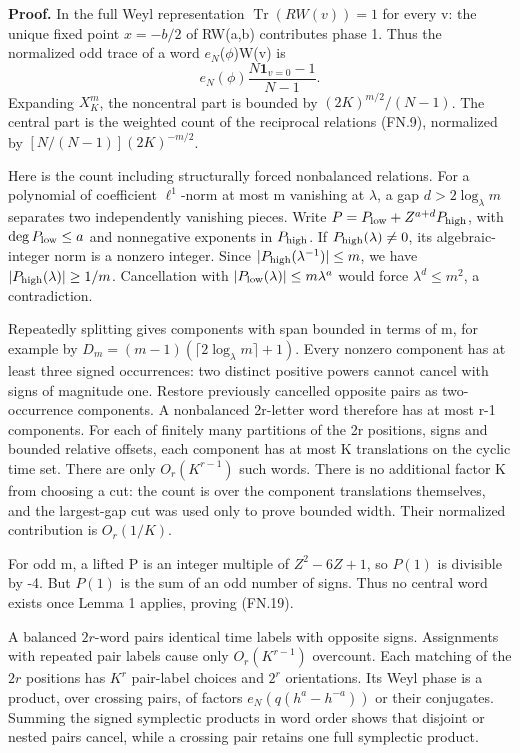 \textbf{Proof.} In the full Weyl representation \(\operatorname{Tr}(RW(v))=1\) for every v: the unique fixed point \(x=-b/2\) of RW(a,b) contributes phase 1. Thus the normalized odd trace of a word \(e_{N}\)(\(\phi\))W(v) is \[
 e_N(\phi)\frac{N\mathbf1_{v=0}-1}{N-1}.                       \tag{FN.20}
\] Expanding \(X_K^m\), the noncentral part is bounded by \((2K)^{m/2}/(N-1)\). The central part is the weighted count of the reciprocal relations (FN.9), normalized by \([N/(N-1)](2K)^{-m/2}\).

Here is the count including structurally forced nonbalanced relations. For a polynomial of coefficient \(\ell^1\)-norm at most m vanishing at \(\lambda\), a gap \(d>2\log_\lambda m\) separates two independently vanishing pieces. Write \(P=P_{\rm low}+Z^{a+d}P_{\rm high}\), with \(\deg P_{\rm low}\leq a\) and nonnegative exponents in \(P_{\rm high}\). If \(P_{\rm high}(\lambda)\ne0\), its algebraic-integer norm is a nonzero integer. Since \(|P_{\rm high}(\lambda^{-1})|\leq m\), we have \(|P_{\rm high}(\lambda)|\geq1/m\). Cancellation with \(|P_{\rm low}(\lambda)|\leq m\lambda^a\) would force \(\lambda^d\leq m^2\), a contradiction.

Repeatedly splitting gives components with span bounded in terms of m, for example by \(D_m=(m-1)(\lceil2\log_\lambda m\rceil+1)\). Every nonzero component has at least three signed occurrences: two distinct positive powers cannot cancel with signs of magnitude one. Restore previously cancelled opposite pairs as two-occurrence components. A nonbalanced 2r-letter word therefore has at most r-1 components. For each of finitely many partitions of the 2r positions, signs and bounded relative offsets, each component has at most K translations on the cyclic time set. There are only \(O_r(K^{r-1})\) such words. There is no additional factor K from choosing a cut: the count is over the component translations themselves, and the largest-gap cut was used only to prove bounded width. Their normalized contribution is \(O_r(1/K)\).

For odd m, a lifted P is an integer multiple of \(Z^2-6Z+1\), so \(P(1)\) is divisible by -4. But \(P(1)\) is the sum of an odd number of signs. Thus no central word exists once Lemma 1 applies, proving (FN.19).

A balanced \(2r\)-word pairs identical time labels with opposite signs. Assignments with repeated pair labels cause only \(O_r(K^{r-1})\) overcount. Each matching of the \(2r\) positions has \(K^r\) pair-label choices and \(2^r\) orientations. Its Weyl phase is a product, over crossing pairs, of factors \(e_N(q(h^a-h^{-a}))\) or their conjugates. Summing the signed symplectic products in word order shows that disjoint or nested pairs cancel, while a crossing pair retains one full symplectic product.

